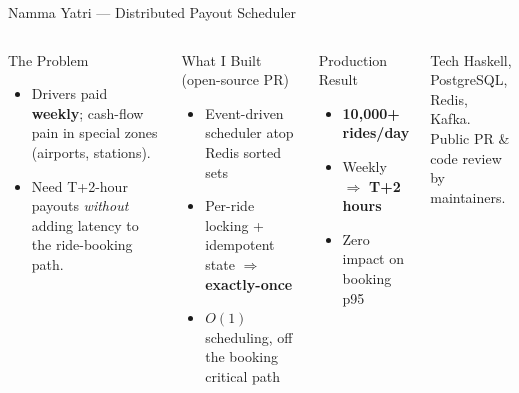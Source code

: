 \documentclass[aspectratio=169,xcolor=dvipsnames,9pt]{beamer}
\begin{document}
\begin{frame}{Namma Yatri --- Distributed Payout Scheduler}
\begin{columns}[T]
  \begin{block}{The Problem}
    \footnotesize
    \begin{itemize}
      \item Drivers paid \textbf{weekly}; cash-flow pain in special zones (airports, stations).
      \item Need T+2-hour payouts \emph{without} adding latency to the ride-booking path.
    \end{itemize}
  \end{block}
  \begin{exampleblock}{What I Built (open-source PR)}
    \footnotesize
    \begin{itemize}
      \item Event-driven scheduler atop Redis sorted sets
      \item Per-ride locking + idempotent state $\Rightarrow$ \textbf{exactly-once}
      \item $O(1)$ scheduling, off the booking critical path
    \end{itemize}
  \end{exampleblock}

  \begin{alertblock}{Production Result}
    \footnotesize
    \begin{itemize}
      \item \textbf{10{,}000+ rides/day}
      \item Weekly $\Rightarrow$ \textbf{T+2 hours}
      \item Zero impact on booking p95
    \end{itemize}
  \end{alertblock}
  \begin{block}{Tech}
    \footnotesize
    Haskell, PostgreSQL, Redis, Kafka.\\
    Public PR \& code review by maintainers.
  \end{block}
\end{columns}
\end{frame}
\end{document}
